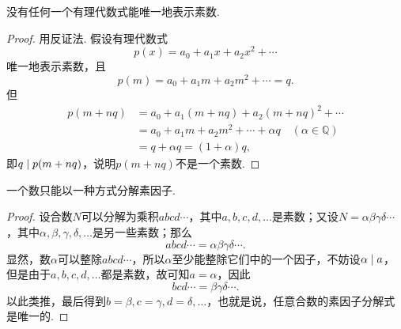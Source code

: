 \begin{theorem}
没有任何一个有理代数式能唯一地表示素数.
\begin{proof}
用反证法.
假设有理代数式\[
p(x) = a_0 + a_1 x + a_2 x^2 + \dotsb
\]唯一地表示素数，且\[
p(m) = a_0 + a_1 m + a_2 m^2 + \dotsb = q.
\]但\begin{align*}
p(m+nq) &= a_0 + a_1 (m+nq) + a_2 (m+nq)^2 + \dotsb \\
&= a_0 + a_1 m + a_2 m^2 + \dotsb + \alpha q \quad(\alpha\in\mathbb{Q}) \\
&= q + \alpha q = (1+\alpha)q,
\end{align*}即\(\truediv{p(m+nq)}{q}\)，说明\(p(m+nq)\)不是一个素数.
\end{proof}
\end{theorem}

\begin{theorem}
一个数只能以一种方式分解素因子.
\begin{proof}
设合数\(N\)可以分解为乘积\(abcd\dotsm\)，其中\(a,b,c,d,\dotsc\)是素数；又设\(N = \alpha\beta\gamma\delta\dotsm\)，其中\(\alpha,\beta,\gamma,\delta,\dotsc\)是另一些素数；那么\[
abcd\dotsm = \alpha\beta\gamma\delta\dotsm.
\]
显然，数\(\alpha\)可以整除\(abcd\dotsm\)，所以\(\alpha\)至少能整除它们中的一个因子，不妨设\(\truediv{a}{\alpha}\)，但是由于\(a,b,c,d,\dotsc\)都是素数，故可知\(a=\alpha\)，因此\[
bcd\dotsm = \beta\gamma\delta\dotsm.
\]以此类推，最后得到\(b=\beta,c=\gamma,d=\delta,\dotsc\)，也就是说，任意合数的素因子分解式是唯一的.
\end{proof}
\end{theorem}

